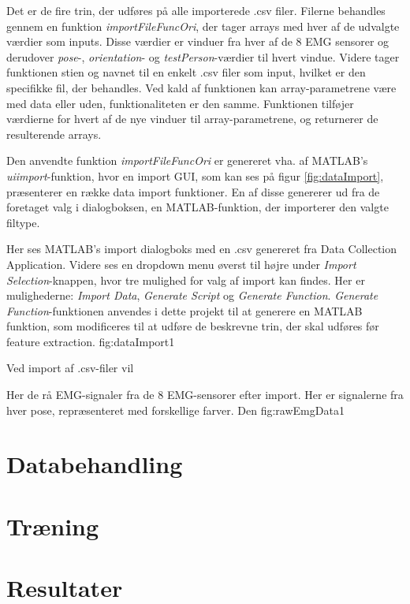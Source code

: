 Det er de fire trin, der udføres på alle importerede .csv filer. Filerne behandles gennem en funktion \textit{importFileFuncOri}, der tager arrays med hver af de udvalgte værdier som inputs. Disse værdier er vinduer fra hver af de 8 EMG sensorer og derudover \textit{pose}-, \textit{orientation}- og \textit{testPerson}-værdier til hvert vindue. Videre tager funktionen stien og navnet til en enkelt .csv filer som input, hvilket er den specifikke fil, der behandles. Ved kald af funktionen kan array-parametrene være med data eller uden, funktionaliteten er den samme. Funktionen tilføjer værdierne for hvert af de nye vinduer til array-parametrene, og returnerer de resulterende arrays. 

Den anvendte funktion \textit{importFileFuncOri} er genereret vha. af MATLAB's \textit{uiimport}-funktion, hvor en import GUI, som kan ses på figur \ref{fig:dataImport}, præsenterer en række data import funktioner. En af disse genererer ud fra de foretaget valg i dialogboksen, en MATLAB-funktion, der importerer den valgte filtype.

{
	Her ses MATLAB's import dialogboks med en .csv genereret fra Data Collection Application. Videre ses en dropdown menu øverst til højre under \textit{Import 		Selection}-knappen, hvor tre mulighed for valg af import kan findes. Her er mulighederne: \textit{Import Data}, \textit{Generate Script} og \textit{Generate Function}. \textit{Generate Function}-funktionen anvendes i dette projekt til at generere en MATLAB funktion, som modificeres til at udføre de beskrevne trin, der skal udføres før feature extraction.
 }{fig:dataImport}{1}
 

Ved import af .csv-filer vil 

{
	Her de rå EMG-signaler fra de 8 EMG-sensorer efter import. Her er signalerne fra hver pose, repræsenteret med forskellige farver. Den 
 }{fig:rawEmgData}{1}

\section{Databehandling}

\section{Træning}

\section{Resultater}